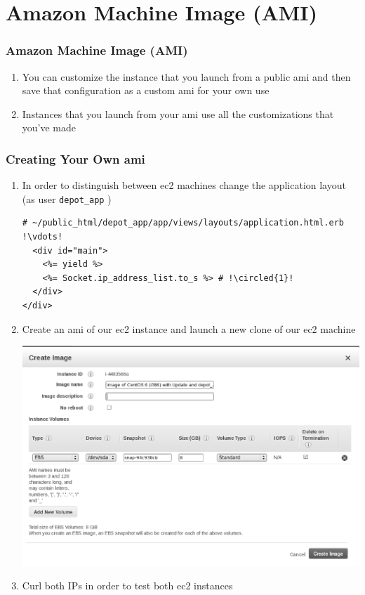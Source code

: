 \documentclass{beamer}
\newcommand*\circled[1]{\tikz[baseline=(char.base)]{
            \node[shape=circle,draw,inner sep=2pt] (char) {#1};}}
\begin{document}
\section{Amazon Machine Image (AMI)}
\begin{frame}
\frametitle{Amazon Machine Image (AMI)}
\begin{enumerate}
\item You can customize the instance that you launch from a public \acrshort{ami} and then save that configuration as a custom \acrshort{ami} for your own use
\item Instances that you launch from your \acrshort{ami} use all the customizations that you've made
\end{enumerate}

\end{frame}
\begin{frame}
\frametitle{Creating Your Own \acrshort{ami}}
\begin{enumerate}
\item In order to distinguish between \acrshort{ec2} machines change the application layout (as user \texttt{depot\_app} )

\lstset{language=html, style=eclipse}
\begin{lstlisting}[escapechar=!]
# ~/public_html/depot_app/app/views/layouts/application.html.erb
!\vdots!
  <div id="main">
    <%= yield %>
    <%= Socket.ip_address_list.to_s %> # !\circled{1}!
  </div>
</div>
\end{lstlisting}

\item Create an \acrshort{ami} of our \acrshort{ec2} instance and launch a new clone of our \acrshort{ec2} machine
\begin{center}
\includegraphics[scale=0.25]{createimage.eps}
\end{center}
\item Curl both IPs in order to test both \acrshort{ec2} instances
\end{enumerate}

\end{frame}
\end{document}
